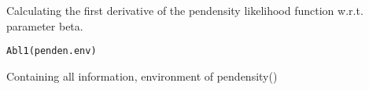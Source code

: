\begin{Description}\relax
Calculating the first derivative of the pendensity likelihood function w.r.t. parameter beta.
\end{Description}
\begin{Usage}
\begin{verbatim}
Abl1(penden.env)
\end{verbatim}
\end{Usage}
\begin{Arguments}
\begin{ldescription}
\item[\code{penden.env}] Containing all information, environment of pendensity()
\end{ldescription}
\end{Arguments}

